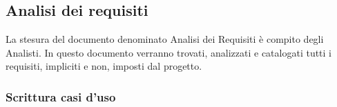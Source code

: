 %
%
%
%
%

\subsection{Analisi dei requisiti}
\label{6.1}
La stesura del documento denominato Analisi dei Requisiti è compito degli Analisti.
In questo documento verranno trovati, analizzati e catalogati tutti i requisiti, impliciti e non, imposti dal progetto.

\subsubsection{Scrittura casi d'uso}






